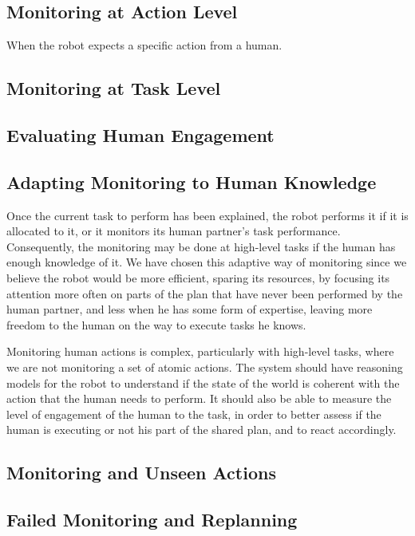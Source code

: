 \subsection{Monitoring at Action Level}
When the robot expects a specific action from a human.

\subsection{Monitoring at Task Level}

\subsection{Evaluating Human Engagement}

\subsection{Adapting Monitoring to Human Knowledge}
Once the current task to perform has been explained, the robot performs it if it is allocated to it, or it  monitors its human partner's task performance. Consequently, the monitoring may be done at high-level tasks if the human has enough knowledge of it.
We have chosen this adaptive way of monitoring since we believe the robot would be more efficient, sparing its resources, by focusing its attention more often on parts of the plan that have never been performed by the human partner, and less when he has some form of expertise, leaving more freedom to the human on the way to execute tasks he knows.

Monitoring human actions is complex, particularly with high-level tasks, where we are not monitoring a set of atomic actions. The system should have reasoning models for the robot to understand if the state of the world is coherent with the action that the human needs to perform. It should also be able to measure the level of engagement of the human to the task, in order to better assess if the human is executing or not his part of the shared plan, and to react accordingly.

\subsection{Monitoring and Unseen Actions}

\subsection{Failed Monitoring and Replanning}



